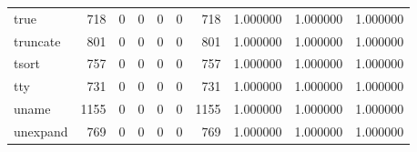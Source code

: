 \begin{longtable}{lrrrrrrrrr}
true      &                                                718 &                                                  0 &                                                  0 &                                                  0 &                                                  0 &                                                718 &                                           1.000000 &                               1.000000 &                             1.000000 \\
truncate  &                                                801 &                                                  0 &                                                  0 &                                                  0 &                                                  0 &                                                801 &                                           1.000000 &                               1.000000 &                             1.000000 \\
tsort     &                                                757 &                                                  0 &                                                  0 &                                                  0 &                                                  0 &                                                757 &                                           1.000000 &                               1.000000 &                             1.000000 \\
tty       &                                                731 &                                                  0 &                                                  0 &                                                  0 &                                                  0 &                                                731 &                                           1.000000 &                               1.000000 &                             1.000000 \\
uname     &                                               1155 &                                                  0 &                                                  0 &                                                  0 &                                                  0 &                                               1155 &                                           1.000000 &                               1.000000 &                             1.000000 \\
unexpand  &                                                769 &                                                  0 &                                                  0 &                                                  0 &                                                  0 &                                                769 &                                           1.000000 &                               1.000000 &                             1.000000 \\

\end{longtable}
